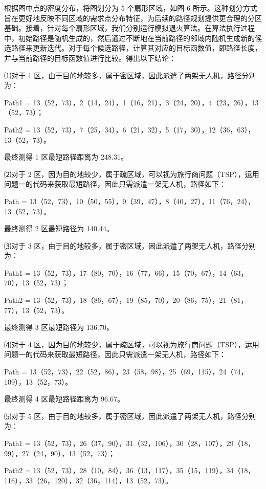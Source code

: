 \documentclass[a4paper]{article} %
\begin{document}
{        根据图中点的密度分布，将图划分为 5 个扇形区域，如图 6 所示。这种划分方式旨在更好地反映不同区域的需求点分布特征，为后续的路径规划提供更合理的分区基础。接着，针对每个扇形区域，我们分别运行模拟退火算法。在算法执行过程中，初始路径是随机生成的，然后通过不断地在当前路径的邻域内随机生成新的候选路径来更新迭代。对于每个候选路径，计算其对应的目标函数值，即路径长度，并与当前路径的目标函数值进行比较。得出以下结论：

        ⑴对于 1 区，由于目的地较多，属于密区域，因此派遣了两架无人机，路径分别为：

        Path1 = {13（52，73），2（14，24），1（16，21），3（24，20），4（23，26），13（52，73）}；

        Path2 = {13（52，73），7（25，34），6（21，32），5（17，30），12（36，63），13（52，73）}。

        最终测得 1 区最短路径距离为 248.31。

        ⑵对于 2 区，因为目的地较少，属于疏区域，可以视为旅行商问题（TSP），运用问题一的代码来获取最短路径，因此只需派遣一架无人机，路径如下：

        Path = {13（52，73），10（50，55），9（39，47），8（40，27），11（76，24），13（52，73）}。

        最终测得 2 区最短路径为 140.44。

        ⑶对于 3 区，由于目的地较多，属于密区域，因此派遣了两架无人机，路径分别为：

        Path1 = {13（52，73），17（80，70），16（77，66），15（70，67），14（63，70），13（52，73）}；

        Path2 = {13（52，73），18（86，67），19（85，70），20（86，75），21（81，77），13（52，73）}。

        最终测得 3 区最短路径为 136.70。

        ⑷对于 4 区，因为目的地较少，属于疏区域，可以视为旅行商问题（TSP），运用问题一的代码来获取最短路径，因此只需派遣一架无人机，路径如下：

        Path = {13（52，73），22（52，86），23（58，98），25（69，115），24（74，109），13（52，73）}。

        最终测得 4 区最短路径距离为 96.67。

        ⑸对于 5 区，由于目的地较多，属于密区域，因此派遣了两架无人机，路径分别为：

        Path1 = {13（52，73），26（37，90），31（32，106），30（28，107），29（18，99），27（24，90），13（52，73）}；

        Path2 = {13（52，73），28（10，84），36（13，117），35（15，119），34（18，116），33（26，120），32（36，114），13（52，73）}。

}
\end{document}
